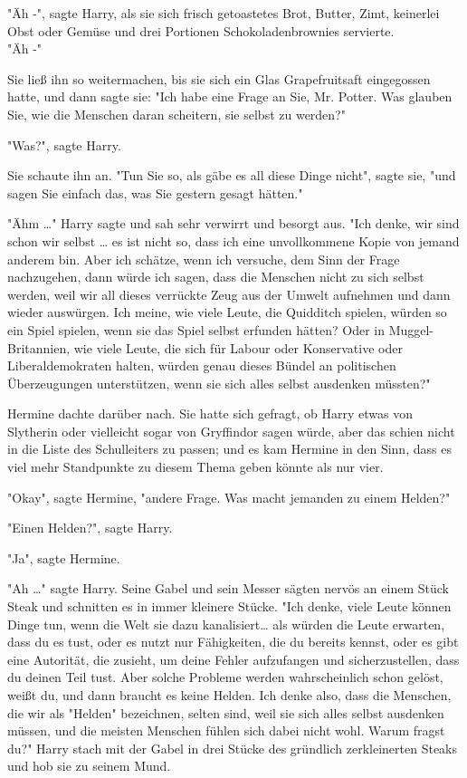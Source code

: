 {"Äh -", sagte Harry, als sie sich frisch getoastetes Brot, Butter, Zimt, keinerlei Obst oder Gemüse und drei Portionen Schokoladenbrownies servierte.\\ "Äh -"

Sie ließ ihn so weitermachen, bis sie sich ein Glas Grapefruitsaft eingegossen hatte, und dann sagte sie: "Ich habe eine Frage an Sie, Mr. Potter. Was glauben Sie, wie die Menschen daran scheitern, sie selbst zu werden?"

"Was?", sagte Harry.

Sie schaute ihn an. "Tun Sie so, als gäbe es all diese Dinge nicht", sagte sie, "und sagen Sie einfach das, was Sie gestern gesagt hätten."

"Ähm …" Harry sagte und sah sehr verwirrt und besorgt aus. "Ich denke, wir sind schon wir selbst … es ist nicht so, dass ich eine unvollkommene Kopie von jemand anderem bin. Aber ich schätze, wenn ich versuche, dem Sinn der Frage nachzugehen, dann würde ich sagen, dass die Menschen nicht zu sich selbst werden, weil wir all dieses verrückte Zeug aus der Umwelt aufnehmen und dann wieder auswürgen. Ich meine, wie viele Leute, die Quidditch spielen, würden so ein Spiel spielen, wenn sie das Spiel selbst erfunden hätten? Oder in Muggel-Britannien, wie viele Leute, die sich für Labour oder Konservative oder Liberaldemokraten halten, würden genau dieses Bündel an politischen Überzeugungen unterstützen, wenn sie sich alles selbst ausdenken müssten?"

Hermine dachte darüber nach. Sie hatte sich gefragt, ob Harry etwas von Slytherin oder vielleicht sogar von Gryffindor sagen würde, aber das schien nicht in die Liste des Schulleiters zu passen; und es kam Hermine in den Sinn, dass es viel mehr Standpunkte zu diesem Thema geben könnte als nur vier.

"Okay", sagte Hermine, "andere Frage. Was macht jemanden zu einem Helden?"

"Einen Helden?", sagte Harry.

"Ja", sagte Hermine.

"Ah …" sagte Harry. Seine Gabel und sein Messer sägten nervös an einem Stück Steak und schnitten es in immer kleinere Stücke. "Ich denke, viele Leute können Dinge tun, wenn die Welt sie dazu kanalisiert… als würden die Leute erwarten, dass du es tust, oder es nutzt nur Fähigkeiten, die du bereits kennst, oder es gibt eine Autorität, die zusieht, um deine Fehler aufzufangen und sicherzustellen, dass du deinen Teil tust. Aber solche Probleme werden wahrscheinlich schon gelöst, weißt du, und dann braucht es keine Helden. Ich denke also, dass die Menschen, die wir als "Helden" bezeichnen, selten sind, weil sie sich alles selbst ausdenken müssen, und die meisten Menschen fühlen sich dabei nicht wohl. Warum fragst du?" Harry stach mit der Gabel in drei Stücke des gründlich zerkleinerten Steaks und hob sie zu seinem Mund.

}
